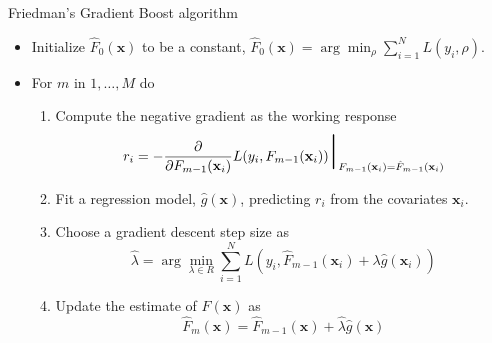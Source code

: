 \documentclass{beamer}
\begin{document}
                     \begin{frame}{Friedman's Gradient Boost algorithm}
                     \begin{itemize}
\item Initialize $\hat F_0(\mathbf{x})$ to be a constant, $\hat F_0(\mathbf{x}) = \arg \min_{\rho} \sum_{i=1}^N L(y_i,\rho)$. \\
\item For $m$ in $1,\ldots,M$ do
\begin{enumerate}
\item Compute the negative gradient as the working response
    \begin{equation}
    r_i = -\frac{\partial}{\partial F_{m-1}(\mathbf{x}_i)} L(y_i,F_{m-1}(\mathbf{x}_i)) \mbox{\Huge $|$}_{F_{m-1}(\mathbf{x}_i)=\hat F_{m-1}(\mathbf{x}_i)}
    \end{equation}
\item Fit a regression model, $\hat{g}(\mathbf{x})$, predicting $r_i$ from the covariates $\mathbf{x}_i$. \item Choose a gradient descent step size as
    \begin{equation}
    \hat\lambda = \arg \min_{\lambda\in R} \sum_{i=1}^N L(y_i,\hat F_{m-1}(\mathbf{x}_i)+\lambda \hat{g}(\mathbf{x}_i))
    \end{equation}
\item Update the estimate of $F(\mathbf{x})$ as
    \begin{equation}
    \hat F_m(\mathbf{x}) = \hat F_{m-1}(\mathbf{x}) + \hat\lambda \hat{g}(\mathbf{x})
    \end{equation}
\end{enumerate} 
\end{itemize}
                     \end{frame}
                         
\end{document}
